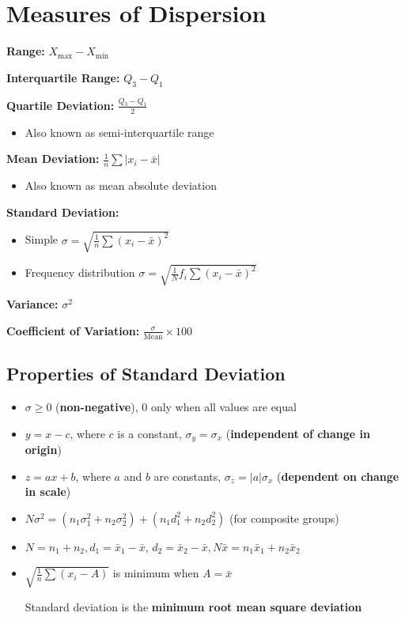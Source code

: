 \section*{Measures of Dispersion}

\textbf{Range:} $X_{\text{max}} - X_{\text{min}}$

\textbf{Interquartile Range:} $Q_3 - Q_1$

\textbf{Quartile Deviation:} $\frac{Q_3 - Q_1}{2}$
\begin{itemize}
    \item Also known as semi-interquartile range
\end{itemize}

\textbf{Mean Deviation:} $\frac{1}{n} \sum |x_i - \bar{x}|$
\begin{itemize}
    \item Also known as mean absolute deviation
\end{itemize}

\textbf{Standard Deviation:}

\begin{itemize}
    \item Simple $\sigma = \sqrt{\frac{1}{n} \sum (x_i - \bar{x})^2}$
    \item Frequency distribution $\sigma = \sqrt{\frac{1}{N} f_i\sum (x_i - \bar{x})^2}$
\end{itemize}


\textbf{Variance:} $\sigma^2$

\textbf{Coefficient of Variation:} $\frac{\sigma}{\text{Mean}} \times 100$

\subsection*{Properties of Standard Deviation}
\begin{itemize}
    \item $\sigma \geq 0$ (\textbf{non-negative}), $0$ only when all values are equal
    \item $y = x - c$, where $c$ is a constant, $\sigma_y = \sigma_x$
    (\textbf{independent of change in origin})
    \item $z = ax + b$, where $a$ and $b$ are constants, $\sigma_z = |a| \sigma_x$ (\textbf{dependent on change in scale})
    \item $N \sigma^2 = (n_1 \sigma_1^2 + n_2 \sigma_2^2) + (n_1 d_1^2 + n_2 d_2^2) $ (for composite groups)
    \item $N = n_1 + n_2, d_1 = \bar{x}_1 - \bar{x}$, $d_2 = \bar{x}_2 - \bar{x}, N \bar{x} = n_1 \bar{x}_1 + n_2 \bar{x}_2$
    \item $\sqrt{\frac{1}{n} \sum(x_i - A)}$ is minimum when $A = \bar{x}$

    Standard deviation is the \textbf{minimum root mean square deviation}
\end{itemize}

